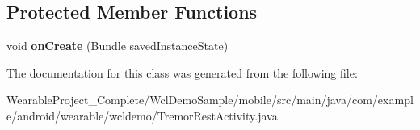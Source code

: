 \subsection*{Protected Member Functions}
\begin{DoxyCompactItemize}
\item 
void {\bfseries on\+Create} (Bundle saved\+Instance\+State)\hypertarget{classcom_1_1example_1_1android_1_1wearable_1_1wcldemo_1_1TremorRestActivity_a0afcef3dcbfa18852f8e0512dc3debeb}{}\label{classcom_1_1example_1_1android_1_1wearable_1_1wcldemo_1_1TremorRestActivity_a0afcef3dcbfa18852f8e0512dc3debeb}

\end{DoxyCompactItemize}


The documentation for this class was generated from the following file\+:\begin{DoxyCompactItemize}
\item 
Wearable\+Project\+\_\+\+Complete/\+Wcl\+Demo\+Sample/mobile/src/main/java/com/example/android/wearable/wcldemo/Tremor\+Rest\+Activity.\+java\end{DoxyCompactItemize}

